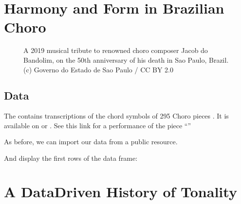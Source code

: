 \documentclass[letterpaper,10pt,english]{sphinxmanual}
\begin{document}
\chapter{Harmony and Form in Brazilian Choro}
\label{\detokenize{choro:harmony-and-form-in-brazilian-choro}}\label{\detokenize{choro::doc}}
\begin{figure}[htbp]
\centering
\capstart

\noindent{}
\caption{A 2019 musical tribute to renowned choro composer Jacob do Bandolim,
on the 50th anniversary of his death in Sao Paulo, Brazil. (c) Governo do Estado de Sao Paulo / CC BY 2.0}\label{\detokenize{choro:id2}}\end{figure}


\section{Data}
\label{\detokenize{choro:data}}
The  contains transcriptions of the chord symbols
of 295 Choro pieces . It is available on  or .
See this link for a performance of the piece “”

As before, we can import our data from a public resource.

\begin{sphinxVerbatim}[commandchars=\\\{\}]
  
   \PYGZbs{}
\end{sphinxVerbatim}

And display the first rows of the data frame:

\begin{sphinxVerbatim}[commandchars=\\\{\}]
\end{sphinxVerbatim}


\chapter{A Data\sphinxhyphen{}Driven History of Tonality}
\label{\detokenize{tonality:a-data-driven-history-of-tonality}}\label{\detokenize{tonality::doc}}
\end{document}
